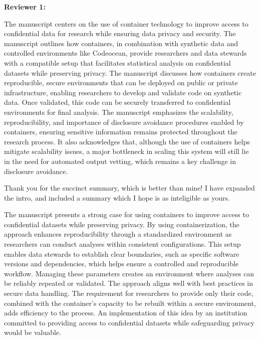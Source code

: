 \textbf{Reviewer 1:}

\begin{referee}
    
The manuscript centers on the use of container technology to improve access to confidential data for research while ensuring data privacy and security.  The manuscript outlines how containers, in combination with synthetic data and controlled environments like Codeocean, provide researchers and data stewards with a compatible setup that facilitates statistical analysis on confidential datasets while preserving privacy.  The manuscript discusses how containers create reproducible, secure environments that can be deployed on public or private infrastructure, enabling researchers to develop and validate code on synthetic data.  Once validated, this code can be securely transferred to confidential environments for final analysis.  The manuscript emphasizes the scalability, reproducibility, and importance of disclosure avoidance procedures enabled by containers, ensuring sensitive information remains protected throughout the research process.  It also acknowledges that, although the use of containers helps mitigate scalability issues, a major bottleneck in scaling this system will still lie in the need for automated output vetting, which remains a key challenge in disclosure avoidance.
\end{referee}

\begin{response}
    Thank you for the succinct summary, which is better than mine! I have expanded the intro, and included a summary which I hope is as inteligible as yours.
\end{response}

\begin{referee}

The manuscript presents a strong case for using containers to improve access to confidential datasets while preserving privacy.  By using containerization, the approach enhances reproducibility through a standardized environment as researchers can conduct analyses within consistent configurations.  This setup enables data stewards to establish clear boundaries, such as specific software versions and dependencies, which helps ensure a controlled and reproducible workflow.  Managing these parameters creates an environment where analyses can be reliably repeated or validated. The approach aligns well with best practices in secure data handling. The requirement for researchers to provide only their code, combined with the container's capacity to be rebuilt within a secure environment, adds efficiency to the process.  An implementation of this idea by an institution committed to providing access to confidential datasets while safeguarding privacy would be valuable.  


\end{referee}


